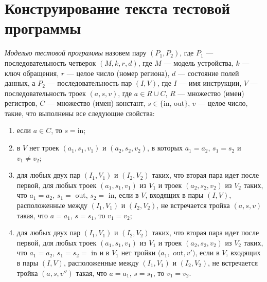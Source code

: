 

\section{Конструирование текста тестовой программы}\label{sec:L1L2_initialization}

\emph{Моделью тестовой программы} назовем пару $(P_1, P_2)$, где $P_1$ --- последовательность четверок $(M, k, r, d)$, где $M$ --- модель устройства, $k$ --- ключ обращения, $r$ --- целое число (номер региона), $d$ --- состояние полей данных, а $P_2$ --- последовательность пар $(I, V)$, где $I$ --- имя инструкции, $V$ --- последовательность троек $(a, s, v)$, где $a \in R \cup C$, $R$ --- множество (имен) регистров, $C$ --- множество (имен) констант, $s \in \{$in, out$\}$, $v$ --- целое число, такие, что выполнены все следующие свойства:
\begin{enumerate}
  \item  если $a \in C$, то $s = $in;
  \item в $V$ нет троек $(a_1, s_1, v_1)$ и $(a_2, s_2, v_2)$, в которых $a_1 = a_2$, $s_1 = s_2$ и $v_1 \neq v_2$;
  \item для любых двух пар $(I_1, V_1)$ и $(I_2, V_2)$ таких, что вторая пара идет после первой, для любых троек $(a_1, s_1, v_1)$ из $V_1$ и троек $(a_2, s_2, v_2)$ из $V_2$ таких, что $a_1 = a_2$, $s_1 =$ out, $s_2 =$ in, если в $V$, входящих в пары $(I, V)$, расположенные между $(I_1, V_1)$ и $(I_2, V_2)$, не встречается тройка $(a, s, v)$ такая, что $a = a_1$, $s = s_1$, то $v_1 = v_2$;
  \item для любых двух пар $(I_1, V_1)$ и $(I_2, V_2)$ таких, что вторая пара идет после первой, для любых троек $(a_1, s_1, v_1)$ из $V_1$ и троек $(a_2, s_2, v_2)$ из $V_2$ таких, что $a_1 = a_2$, $s_1 =s_2 =$ in и в $V_1$ нет тройки $(a_1,$ out$, v')$, если в $V$, входящих в пары $(I, V)$, расположенные между $(I_1, V_1)$ и $(I_2, V_2)$, не встречается тройка $(a, s, v'')$ такая, что $a = a_1$, $s = s_1$, то $v_1 = v_2$.
\end{enumerate}

